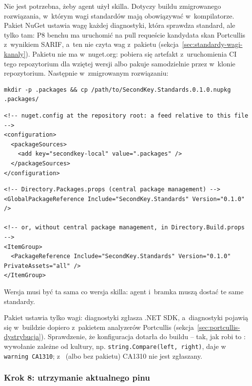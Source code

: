 Nie jest potrzebna, żeby agent użył skilla. Dotyczy buildu zmigrowanego rozwiązania, w~którym
wagi standardów mają obowiązywać w~kompilatorze. Pakiet NuGet 
ustawia wagę każdej diagnostyki, która sprawdza standard, ale tylko tam: P8 benchu ma uruchomić
na pull requeście kandydata skan Portcullis z~wynikiem SARIF, a~ten nie czyta wag z~pakietu
(sekcja~\ref{sec:standardy-wagi-kanaly}). Pakietu nie ma w~nuget.org: pobiera się artefakt
 z~uruchomienia CI tego repozytorium dla wziętej wersji
albo pakuje samodzielnie przez  w~klonie repozytorium.
Następnie w~zmigrowanym rozwiązaniu:

\begin{lstlisting}
mkdir -p .packages && cp /path/to/SecondKey.Standards.0.1.0.nupkg .packages/
\end{lstlisting}

\begin{lstlisting}
<!-- nuget.config at the repository root: a feed relative to this file -->
<configuration>
  <packageSources>
    <add key="secondkey-local" value=".packages" />
  </packageSources>
</configuration>
\end{lstlisting}

\begin{lstlisting}
<!-- Directory.Packages.props (central package management) -->
<GlobalPackageReference Include="SecondKey.Standards" Version="0.1.0" />

<!-- or, without central package management, in Directory.Build.props -->
<ItemGroup>
  <PackageReference Include="SecondKey.Standards" Version="0.1.0" PrivateAssets="all" />
</ItemGroup>
\end{lstlisting}

Wersja musi być ta sama co wersja skilla: agent i~bramka muszą dostać te same standardy.

Pakiet ustawia tylko wagi: diagnostyki  zgłasza .NET SDK, a~diagnostyki
 pojawią się w~buildzie dopiero z~pakietem analyzerów Portcullis
(sekcja~\ref{sec:portcullis-dystrybucja}). Sprawdzenie, że konfiguracja dotarła do buildu
-- tak, jak robi to : wywołanie zależne od kultury, np.
\texttt{string.Compare(left, right)}, daje w~
\texttt{warning CA1310}; z~ (albo bez
pakietu) CA1310 nie jest zgłaszany.

\subsubsection{Krok 8: utrzymanie aktualnego pinu}

